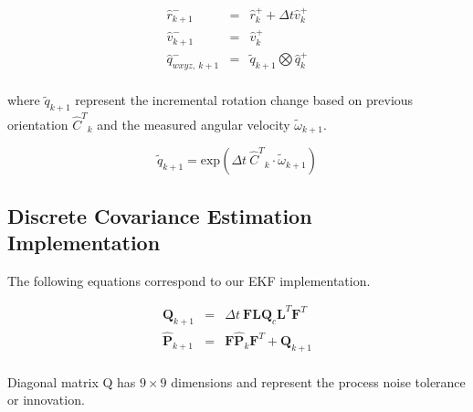 \documentclass[letterpaper, 10 pt, conference]{ieeeconf}  %
\newcommand{\transpose}[1]{\ensuremath{#1^{\scriptscriptstyle T}}}
\begin{document}
\begin{equation}
  \begin{array}{lll}
    \hat{r}_{k+1}^{-} &  = & \hat{r}^{+}_{k} + \Delta t \hat{v}^{+}_{k} \\
    \hat{v}_{k+1}^{-} &  = & \hat{v}^{+}_{k} \\
    \hat{q}_{wxyz,~k+1}^{-} &  = &  \tilde{q}_{k+1} \bigotimes \hat{q}_{k}^{+}\\
  \end{array}
\end{equation}

\noindent
where \(\tilde{q}_{k+1}\) represent the incremental rotation change based on
previous orientation \(\transpose{\hat{C}}_{k}\) and the measured angular
velocity \(\tilde{\omega}_{k+1}\).


\begin{equation}
  \tilde{q}_{k+1} = \text{exp} \left( \Delta t~\transpose{\hat{C}}_{k} \cdot \tilde{\omega}_{k+1} \right)
\end{equation}





\subsection{Discrete Covariance Estimation Implementation}
The following equations correspond to our EKF implementation.

\begin{equation}
  \begin{array}{lll}
  \mathbf{Q}_{k+1} &=& \Delta t~\mathbf{F} \mathbf{L} \mathbf{Q}_{c} \transpose{\mathbf{L}}  \transpose{\mathbf{F}} \\
  \hat{\mathbf{P}}_{k+1} &=& \mathbf{F} \hat{\mathbf{P}}_{k} \transpose{\mathbf{F}}+\mathbf{Q}_{k+1}\\
  \end{array}
\end{equation}

Diagonal matrix Q has \( 9 \times 9 \) dimensions and represent the process
noise tolerance or innovation.
\end{document}
